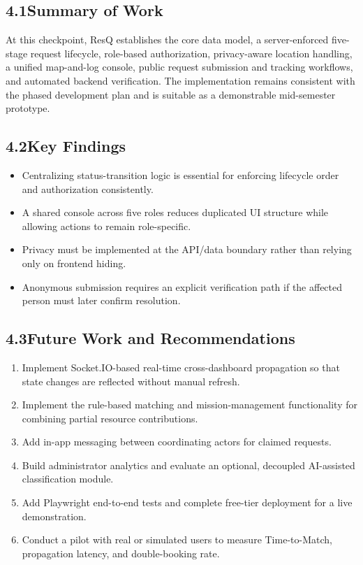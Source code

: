 \documentclass[11pt,a4paper]{article}
\begin{document}
\subsection{4.1\quad Summary of Work}

At this checkpoint, ResQ establishes the core data model, a server-enforced five-stage request lifecycle, role-based authorization, privacy-aware location handling, a unified map-and-log console, public request submission and tracking workflows, and automated backend verification. The implementation remains consistent with the phased development plan and is suitable as a demonstrable mid-semester prototype.

\subsection{4.2\quad Key Findings}

\begin{itemize}
\item Centralizing status-transition logic is essential for enforcing lifecycle order and authorization consistently.
\item A shared console across five roles reduces duplicated UI structure while allowing actions to remain role-specific.
\item Privacy must be implemented at the API/data boundary rather than relying only on frontend hiding.
\item Anonymous submission requires an explicit verification path if the affected person must later confirm resolution.
\end{itemize}

\subsection{4.3\quad Future Work and Recommendations}

\begin{enumerate}
\item Implement Socket.IO-based real-time cross-dashboard propagation so that state changes are reflected without manual refresh.
\item Implement the rule-based matching and mission-management functionality for combining partial resource contributions.
\item Add in-app messaging between coordinating actors for claimed requests.
\item Build administrator analytics and evaluate an optional, decoupled AI-assisted classification module.
\item Add Playwright end-to-end tests and complete free-tier deployment for a live demonstration.
\item Conduct a pilot with real or simulated users to measure Time-to-Match, propagation latency, and double-booking rate.
\end{enumerate}
\end{document}
